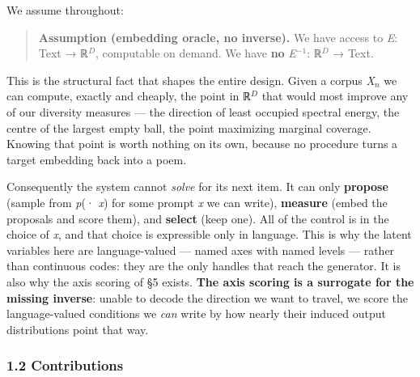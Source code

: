\documentclass[
  10pt,
]{article}
\theoremstyle{plain}
\theoremstyle{definition}
\begin{document}
We assume throughout:

\begin{quote}
\textbf{Assumption (embedding oracle, no inverse).} We have access to
\emph{E}: Text → ℝ\(^{D}\), computable on demand. We have \textbf{no}
\emph{E}\(^{-1}\): ℝ\(^{D}\) → Text.
\end{quote}

This is the structural fact that shapes the entire design. Given a
corpus \emph{X\(_{n}\)} we can compute, exactly and cheaply, the point
in ℝ\(^{D}\) that would most improve any of our diversity measures ---
the direction of least occupied spectral energy, the centre of the
largest empty ball, the point maximizing marginal coverage. Knowing that
point is worth nothing on its own, because no procedure turns a target
embedding back into a poem.

Consequently the system cannot \emph{solve} for its next item. It can
only \textbf{propose} (sample from \emph{p}(· \textbar{} \emph{x}) for
some prompt \emph{x} we can write), \textbf{measure} (embed the
proposals and score them), and \textbf{select} (keep one). All of the
control is in the choice of \emph{x}, and that choice is expressible
only in language. This is why the latent variables here are
language-valued --- named axes with named levels --- rather than
continuous codes: they are the only handles that reach the generator. It
is also why the axis scoring of §5 exists. \textbf{The axis scoring is a
surrogate for the missing inverse}: unable to decode the direction we
want to travel, we score the language-valued conditions we \emph{can}
write by how nearly their induced output distributions point that way.

\subsubsection{1.2 Contributions}\label{12-contributions}
\end{document}
